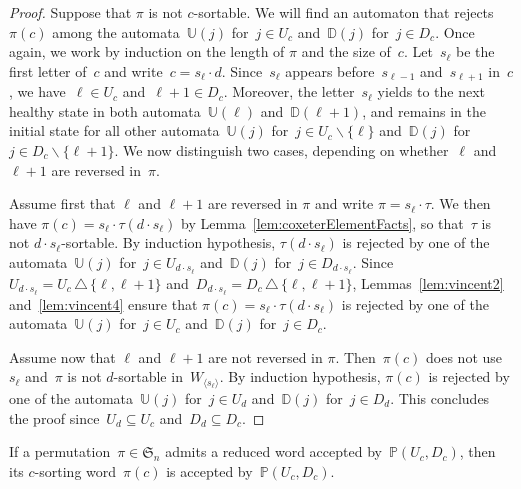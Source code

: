 \documentclass[ALCO]{cedram}
\newcommand{\fS}{\mathfrak{S}}
\newcommand{\ssm}{\smallsetminus}
\newcommand{\symdif}{\,\triangle\,}
\newcommand{\automatonP}{\mathbb{P}}
\newcommand{\automatonU}{\mathbb{U}}
\newcommand{\automatonD}{\mathbb{D}}
\begin{document}
\begin{proof}
Suppose that $\pi$ is not $c$-sortable. We will find an automaton that rejects $\pi(c)$ among the automata~$\automatonU(j)$ for~$j \in U_c$ and~$\automatonD(j)$ for~$j \in D_c$.
Once again, we work by induction on the length of $\pi$ and the size of~$c$.
Let~$s_\ell$ be the first letter of~$c$ and write~$c = s_\ell \cdot d$.
Since~$s_\ell$ appears before~$s_{\ell-1}$ and~$s_{\ell+1}$ in~$c$, we have~$\ell \in U_c$ and~$\ell+1 \in D_c$.
Moreover, the letter~$s_\ell$ yields to the next healthy state in both automata~$\automatonU(\ell)$ and~$\automatonD(\ell+1)$, and remains in the initial state for all other automata~$\automatonU(j)$ for~$j \in U_c \ssm \{\ell\}$ and~$\automatonD(j)$ for~$j \in D_c \ssm \{\ell+1\}$.
We now distinguish two cases, depending on whether~$\ell$ and~$\ell+1$ are reversed in~$\pi$.

Assume first that $\ell$ and $\ell+1$ are reversed in $\pi$ and write $\pi = s_\ell \cdot \tau$.
We then have $\pi(c) = s_\ell \cdot \tau(d \cdot s_\ell)$ by Lemma~\ref{lem:coxeterElementFacts}, so that~$\tau$ is not $d \cdot s_\ell$-sortable.
By induction hypothesis, $\tau(d \cdot s_\ell)$ is rejected by one of the automata~$\automatonU(j)$ for~$j \in U_{d \cdot s_\ell}$ and~$\automatonD(j)$ for~$j \in D_{d \cdot s_\ell}$.
Since~$U_{d \cdot s_\ell} = U_c \symdif \{\ell, \ell+1\}$ and~$D_{d \cdot s_\ell} = D_c \symdif \{\ell, \ell+1\}$, Lemmas~\ref{lem:vincent2} and~\ref{lem:vincent4} ensure that $\pi(c) = s_\ell \cdot \tau(d \cdot s_\ell)$ is rejected by one of the automata~$\automatonU(j)$ for~$j \in U_c$ and~$\automatonD(j)$ for~$j \in D_c$.

Assume now that $\ell$ and $\ell+1$ are not reversed in $\pi$.
Then~$\pi(c)$ does not use~$s_\ell$ and~$\pi$ is not $d$-sortable in~$W_{\langle s_\ell \rangle}$.
By induction hypothesis, $\pi(c)$ is rejected by one of the automata~$\automatonU(j)$ for~$j \in U_d$ and~$\automatonD(j)$ for~$j \in D_d$.
This concludes the proof since~$U_d \subseteq U_c$ and~$D_d \subseteq D_c$.
\end{proof}

\begin{lemma}\label{lem:Vincent11}
If a permutation~$\pi \in \fS_n$ admits a reduced word accepted by~$\automatonP(U_c, D_c)$, then its $c$-sorting word~$\pi(c)$ is accepted by~$\automatonP(U_c, D_c)$.
\end{lemma}
\end{document}
